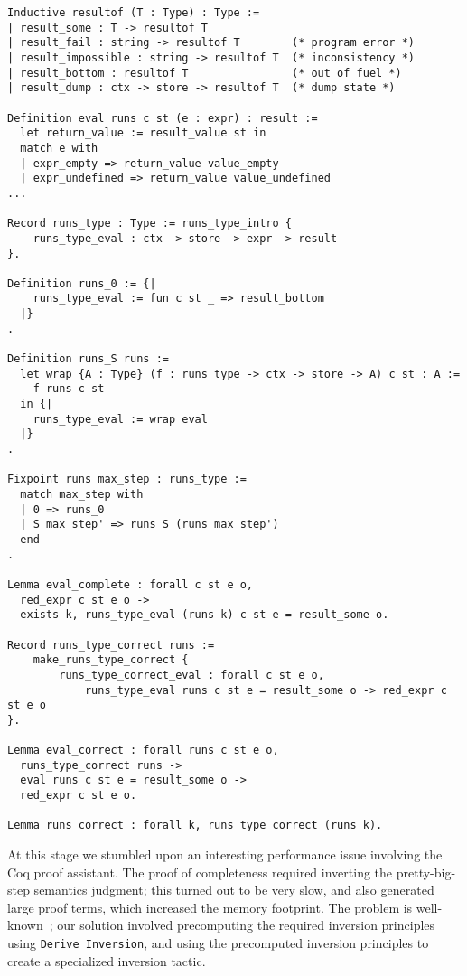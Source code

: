 \documentclass{llncs}
\newcommand{\asi}[1]{\todo[color=green,inline]{#1}}
\begin{document}
\begin{verbatim}
Inductive resultof (T : Type) : Type :=
| result_some : T -> resultof T
| result_fail : string -> resultof T        (* program error *)
| result_impossible : string -> resultof T  (* inconsistency *)
| result_bottom : resultof T                (* out of fuel *)
| result_dump : ctx -> store -> resultof T  (* dump state *)

Definition eval runs c st (e : expr) : result :=
  let return_value := result_value st in
  match e with
  | expr_empty => return_value value_empty
  | expr_undefined => return_value value_undefined
...

Record runs_type : Type := runs_type_intro {
    runs_type_eval : ctx -> store -> expr -> result
}.

Definition runs_0 := {|
    runs_type_eval := fun c st _ => result_bottom
  |}
.

Definition runs_S runs := 
  let wrap {A : Type} (f : runs_type -> ctx -> store -> A) c st : A :=
    f runs c st
  in {|
    runs_type_eval := wrap eval
  |}
.

Fixpoint runs max_step : runs_type :=
  match max_step with
  | 0 => runs_0
  | S max_step' => runs_S (runs max_step')
  end
.

Lemma eval_complete : forall c st e o,
  red_expr c st e o -> 
  exists k, runs_type_eval (runs k) c st e = result_some o.

Record runs_type_correct runs :=
    make_runs_type_correct {
        runs_type_correct_eval : forall c st e o,
            runs_type_eval runs c st e = result_some o -> red_expr c st e o
}.

Lemma eval_correct : forall runs c st e o,
  runs_type_correct runs -> 
  eval runs c st e = result_some o ->
  red_expr c st e o.

Lemma runs_correct : forall k, runs_type_correct (runs k). 
\end{verbatim}

\asi{Add the theorem.}

At this stage we stumbled upon an interesting performance issue 
involving the Coq proof assistant. The proof of completeness required
inverting the pretty-big-step semantics judgment; this turned out
to be very slow, and also generated large proof terms, which increased
the memory footprint. The problem is well-known~\cite{Monin:Coq2}; 
our solution involved
precomputing the required inversion principles using
\texttt{Derive Inversion}, and using the precomputed inversion
principles to create a specialized inversion tactic.
\end{document}
